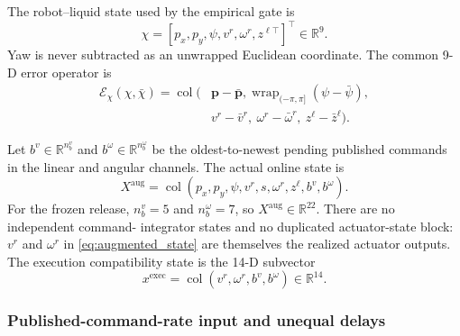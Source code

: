 The robot--liquid state used by the empirical gate is
\begin{equation}
  \chi=[p_x,p_y,\psi,v^r,\omega^r,z^{\ell\top}]^\top
  \in\mathbb R^9.
  \label{eq:gate_state}
\end{equation}
Yaw is never subtracted as an unwrapped Euclidean coordinate.  The common
9-D error operator is
\begin{equation}
\begin{split}
  \mathcal E_\chi(\chi,\bar\chi)=\operatorname{col}\big(&
  \bm p-\bar{\bm p},
  \operatorname{wrap}_{(-\pi,\pi]}(\psi-\bar\psi),\\
  &v^r-\bar v^r,\ \omega^r-\bar\omega^r,\
  z^\ell-\bar z^\ell\big).
\end{split}
\label{eq:gate_error_operator}
\end{equation}

Let $b^v\in\mathbb R^{n_b^v}$ and
$b^\omega\in\mathbb R^{n_b^\omega}$ be the oldest-to-newest pending published
commands in the linear and angular channels.  The actual online state is
\begin{equation}
  X^{\mathrm{aug}}=
  \operatorname{col}(p_x,p_y,\psi,v^r,s,\omega^r,z^\ell,b^v,b^\omega).
  \label{eq:augmented_state}
\end{equation}
For the frozen release, $n_b^v=5$ and $n_b^\omega=7$, so
$X^{\mathrm{aug}}\in\mathbb R^{22}$.  There are no independent command-
integrator states and no duplicated actuator-state block: $v^r$ and
$\omega^r$ in \eqref{eq:augmented_state} are themselves the realized actuator
outputs.  The execution compatibility state is the 14-D subvector
\begin{equation}
  x^{\mathrm{exec}}=
  \operatorname{col}(v^r,\omega^r,b^v,b^\omega)\in\mathbb R^{14}.
  \label{eq:execution_state}
\end{equation}

\subsubsection{Published-command-rate input and unequal delays}

